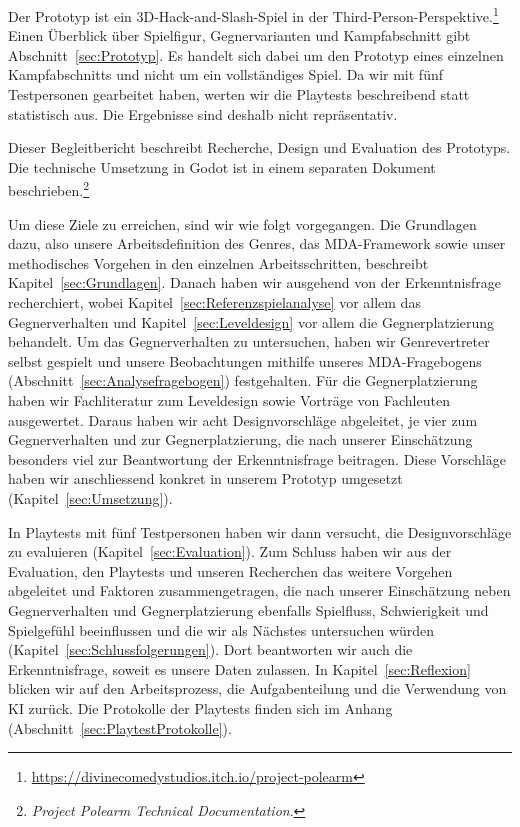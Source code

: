 \documentclass[../Main.tex]{subfiles}
\begin{document}
Der Prototyp ist ein 3D-Hack-and-Slash-Spiel in der Third-Person-Perspektive.\footnote{\url{https://divinecomedystudios.itch.io/project-polearm}} Einen Überblick über Spielfigur, Gegnervarianten und Kampfabschnitt gibt Abschnitt~\ref{sec:Prototyp}. Es handelt sich dabei um den Prototyp eines einzelnen Kampfabschnitts und nicht um ein vollständiges Spiel. Da wir mit fünf Testpersonen gearbeitet haben, werten wir die Playtests beschreibend statt statistisch aus. Die Ergebnisse sind deshalb nicht repräsentativ.

Dieser Begleitbericht beschreibt Recherche, Design und Evaluation des Prototyps. Die technische Umsetzung in Godot ist in einem separaten Dokument beschrieben.\footnote{\textit{Project Polearm Technical Documentation}.}

Um diese Ziele zu erreichen, sind wir wie folgt vorgegangen. Die Grundlagen dazu, also unsere Arbeitsdefinition des Genres, das MDA-Framework sowie unser methodisches Vorgehen in den einzelnen Arbeitsschritten, beschreibt Kapitel~\ref{sec:Grundlagen}. Danach haben wir ausgehend von der Erkenntnisfrage recherchiert, wobei Kapitel~\ref{sec:Referenzspielanalyse} vor allem das Gegnerverhalten und Kapitel~\ref{sec:Leveldesign} vor allem die Gegnerplatzierung behandelt. Um das Gegnerverhalten zu untersuchen, haben wir Genrevertreter selbst gespielt und unsere Beobachtungen mithilfe unseres MDA-Fragebogens (Abschnitt~\ref{sec:Analysefragebogen}) festgehalten. Für die Gegnerplatzierung haben wir Fachliteratur zum Leveldesign\autocite{totten2014architectural,rogers2014levelup} sowie Vorträge von Fachleuten\autocite{gdc_tenprinciples2010,gdc_movingmountains2020,gdc_horizonquests2018} ausgewertet. Daraus haben wir acht Designvorschläge abgeleitet, je vier zum Gegnerverhalten und zur Gegnerplatzierung, die nach unserer Einschätzung besonders viel zur Beantwortung der Erkenntnisfrage beitragen. Diese Vorschläge haben wir anschliessend konkret in unserem Prototyp umgesetzt (Kapitel~\ref{sec:Umsetzung}).

In Playtests mit fünf Testpersonen haben wir dann versucht, die Designvorschläge zu evaluieren (Kapitel~\ref{sec:Evaluation}). Zum Schluss haben wir aus der Evaluation, den Playtests und unseren Recherchen das weitere Vorgehen abgeleitet und Faktoren zusammengetragen, die nach unserer Einschätzung neben Gegnerverhalten und Gegnerplatzierung ebenfalls Spielfluss, Schwierigkeit und Spielgefühl beeinflussen und die wir als Nächstes untersuchen würden (Kapitel~\ref{sec:Schlussfolgerungen}). Dort beantworten wir auch die Erkenntnisfrage, soweit es unsere Daten zulassen. In Kapitel~\ref{sec:Reflexion} blicken wir auf den Arbeitsprozess, die Aufgabenteilung und die Verwendung von KI zurück. Die Protokolle der Playtests finden sich im Anhang (Abschnitt~\ref{sec:PlaytestProtokolle}).

\newpage
\end{document}
